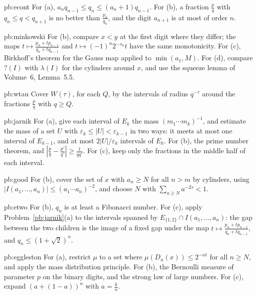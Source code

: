 \begin{hint}{pb:econt}
For (a), $a_nq_{n-1}\le q_n\le(a_n+1)q_{n-1}$. For (b), a fraction $\frac pq$ with $q_n\le q<q_{n+1}$ is no better than $\frac{p_n}{q_n}$, and the digit $a_{n+1}$ is
at most of order $n$.
\end{hint}

\begin{hint}{pb:minkowski}
For (b), compare $x<y$ at the first digit where they differ; the maps $t\mapsto\frac{p_n+tp_{n-1}}{q_n+tq_{n-1}}$ and $t\mapsto(-1)^n2^{-s_n}t$ have the same
monotonicity. For (c), Birkhoff's theorem for the Gauss map applied to $\min(a_1,M)$. For (d), compare $?(I)$ with $\lambda(I)$ for the cylinders around
$x$, and use the squeeze lemma of Volume~6, Lemma~5.5.
\end{hint}

\begin{hint}{pb:wtau}
Cover $W(\tau)$, for each $Q$, by the intervals of radius $q^{-\tau}$ around the fractions $\frac pq$ with $q\ge Q$.
\end{hint}

\begin{hint}{pb:jarnik}
For (a), give each interval of $E_k$ the mass $(m_1\cdots m_k)^{-1}$, and estimate the mass of a set $U$ with $\varepsilon_k\le|U|<\varepsilon_{k-1}$ in two
ways: it meets at most one interval of $E_{k-1}$, and at most $2|U|/\varepsilon_k$ intervals of $E_k$. For (b), the prime number theorem, and
$|\frac pq-\frac{p'}{q'}|\ge\frac1{qq'}$. For (c), keep only the fractions in the middle half of each interval.
\end{hint}

\begin{hint}{pb:good}
For (b), cover the set of $x$ with $a_n\ge N$ for all $n>m$ by cylinders, using $|I(a_1,\dots,a_n)|\le(a_1\cdots a_n)^{-2}$, and choose $N$ with
$\sum_{a\ge N}a^{-2s}<1$.
\end{hint}

\begin{hint}{pb:etwo}
For (b), $q_n$ is at least a Fibonacci number. For (c), apply Problem~\ref{pb:jarnik}(a) to the intervals spanned by $E_{\{1,2\}}\cap I(a_1,\dots,a_n)$:
the gap between the two children is the image of a fixed gap under the map $t\mapsto\frac{p_n+tp_{n-1}}{q_n+tq_{n-1}}$, and $q_n\le(1+\sqrt2)^n$.
\end{hint}

\begin{hint}{pb:eggleston}
For (a), restrict $\mu$ to a set where $\mu(D_n(x))\le2^{-nt}$ for all $n\ge N$, and apply the mass distribution principle. For (b), the Bernoulli measure of
parameter $p$ on the binary digits, and the strong law of large numbers. For (c), expand $(a+(1-a))^n$ with $a=\frac kn$.
\end{hint}

